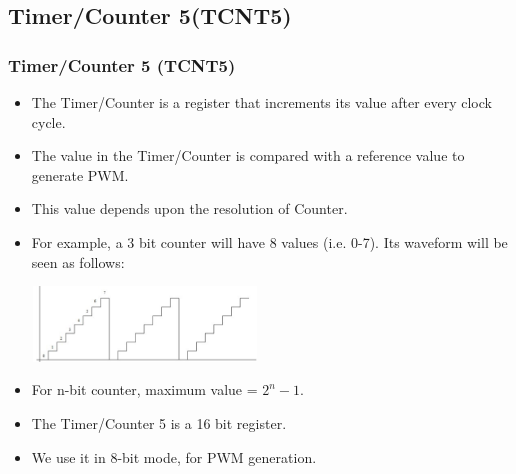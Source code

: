 \documentclass[table,10pt,red]{beamer}	%
\begin{document}
\subsection{Timer/Counter 5(TCNT5)} 
\begin{frame}
	\frametitle{Timer/Counter 5 (TCNT5) }
	\begin{itemize}  %
		\item <+-|alert@+> The Timer/Counter is a register that increments its value after every clock cycle. 	
		\item <+-|alert@+> The value in the Timer/Counter is compared with a reference value to generate PWM.
		\item <+-|alert@+> This value depends upon the resolution of Counter.
		\item <+-|alert@+> For example, a 3 bit counter will have 8 values (i.e. 0-7). Its waveform will be seen as follows: 
		\pause
		\vfill
		\begin{center}
			\includegraphics[height=2cm, width=6cm]{PWM2}
		\end{center}
		\item <+-|alert@+> For n-bit counter, maximum value = $2^n - 1$.
		\item <+-|alert@+> The Timer/Counter 5 is a 16 bit register. 
		\item <+-|alert@+> We use it in 8-bit mode, for PWM generation.				
\end{itemize}
\end{frame}

\end{document}

